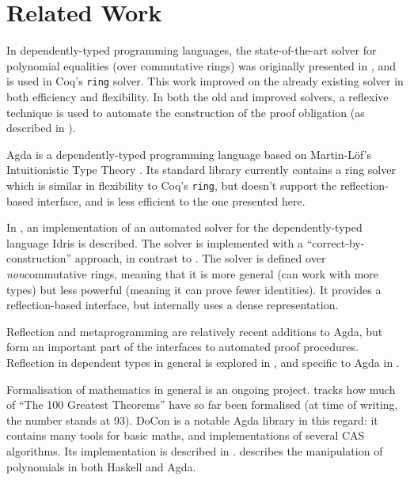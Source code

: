 \documentclass[acmsmall,review,anonymous]{acmart}\settopmatter{printfolios=true,printccs=false,printacmref=false}
\theoremstyle{remark}
\begin{document}
\section{Related Work}
In dependently-typed programming languages, the state-of-the-art solver for
polynomial equalities (over commutative rings) was originally presented
in \citet{gregoire_proving_2005}, and is used in Coq's \verb+ring+ solver. This
work improved on the already existing solver \cite{Coq:manual} in both efficiency
and flexibility. In both the old and improved solvers, a reflexive technique is
used to automate the construction of the proof obligation (as described in
\citet{boutin_using_1997}).

Agda \cite{norell_dependently_2008} is a dependently-typed programming language
based on Martin-Löf's Intuitionistic Type
Theory \cite{martin-lof_intuitionistic_1980}. Its standard
library \cite{danielsson_agda_2018} currently contains a ring solver which is
similar in flexibility to Coq's \verb+ring+, but doesn't support the
reflection-based interface, and is less efficient to the one presented here. 

In \citet{geuvers_automatically_2017}, an implementation of an automated solver
for the dependently-typed language Idris \cite{brady_idris_2013} is described.
The solver is implemented with a ``correct-by-construction'' approach, in
contrast to \citet{gregoire_proving_2005}. The solver is defined over
\emph{non}commutative rings, meaning that it is more general (can work with more
types) but less powerful (meaning it can prove fewer identities). It provides a
reflection-based interface, but internally uses a dense representation.

Reflection and metaprogramming are relatively recent additions to Agda, but form
an important part of the interfaces to automated proof procedures. Reflection in
dependent types in general is explored in \citet{christiansen_practical_2015},
and specific to Agda in \citet{van_der_walt_reflection_2012}.

Formalisation of mathematics in general is an ongoing project.
\citet{wiedijk_formalizing_2018} tracks how much of ``The 100 Greatest Theorems''
\cite{kahl_hundred_2004} have so far been formalised (at time of writing, the
number stands at 93). DoCon \cite{meshveliani_docon-provable_2018} is a notable
Agda library in this regard: it contains many tools for basic maths, and
implementations of several CAS algorithms. Its implementation is described
in \citet{meshveliani_dependent_2013}. \citet{cheng_functional_2018} describes the
manipulation of polynomials in both Haskell and Agda.
\end{document}
